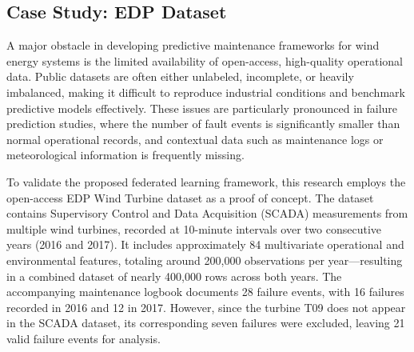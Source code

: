 \documentclass[12pt]{article}
\begin{document}


\subsection{Case Study: EDP Dataset}

A major obstacle in developing predictive maintenance frameworks for wind energy systems is the limited availability of open-access, high-quality operational data. Public datasets are often either unlabeled, incomplete, or heavily imbalanced, making it difficult to reproduce industrial conditions and benchmark predictive models effectively. These issues are particularly pronounced in failure prediction studies, where the number of fault events is significantly smaller than normal operational records, and contextual data such as maintenance logs or meteorological information is frequently missing.

To validate the proposed federated learning framework, this research employs the open-access EDP Wind Turbine dataset as a proof of concept. The dataset contains Supervisory Control and Data Acquisition (SCADA) measurements from multiple wind turbines, recorded at 10-minute intervals over two consecutive years (2016 and 2017). It includes approximately 84 multivariate operational and environmental features, totaling around 200,000 observations per year—resulting in a combined dataset of nearly 400,000 rows across both years. The accompanying maintenance logbook documents 28 failure events, with 16 failures recorded in 2016 and 12 in 2017. However, since the turbine T09 does not appear in the SCADA dataset, its corresponding seven failures were excluded, leaving 21 valid failure events for analysis.
\end{document}
